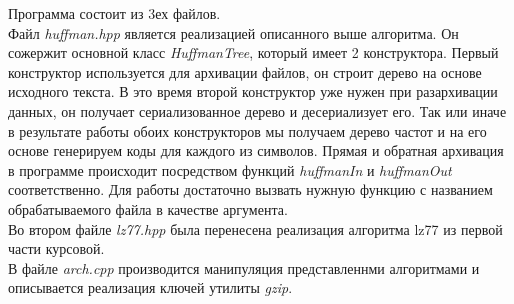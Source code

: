 \documentclass[12pt]{article}
\begin{document}
    Программа состоит из 3ех файлов. \\
    Файл \textit{huffman.hpp} является реализацией описанного выше алгоритма. Он сожержит основной класс \textit{HuffmanTree}, который имеет 2 конструктора. Первый конструктор используется для архивации файлов, он строит дерево на основе исходного текста. В это время второй конструктор уже нужен при разархивации данных, он получает сериализованное дерево и десериализует его. Так или иначе в результате работы обоих конструкторов мы получаем дерево частот и на его основе генерируем коды для каждого из символов. Прямая и обратная архивация в программе происходит посредством функций \textit{huffmanIn} и \textit{huffmanOut} соответственно. Для работы достаточно вызвать нужную функцию с названием обрабатываемого файла в качестве аргумента. \\
    Во втором файле \textit{lz77.hpp} была перенесена реализация алгоритма lz77 из первой части курсовой.\\
    В файле \textit{arch.cpp} производится манипуляция представленнми алгоритмами и описывается реализация ключей утилиты \textit{gzip}.
    
\end{document}
